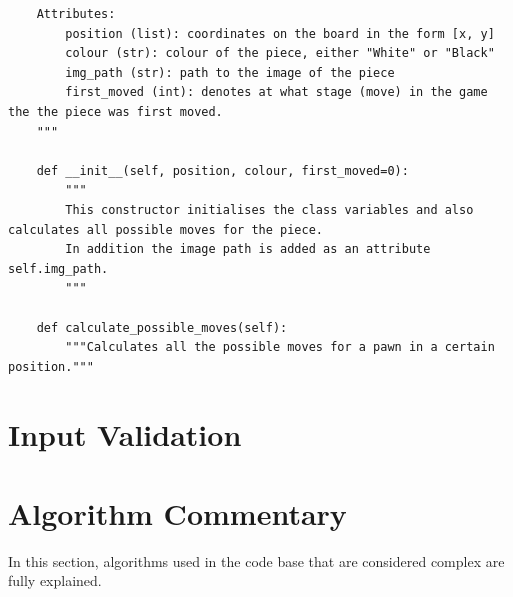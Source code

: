 \begin{verbatim}
	Attributes:
		position (list): coordinates on the board in the form [x, y]
		colour (str): colour of the piece, either "White" or "Black"
		img_path (str): path to the image of the piece
		first_moved (int): denotes at what stage (move) in the game the the piece was first moved.
	"""

	def __init__(self, position, colour, first_moved=0):
		"""
		This constructor initialises the class variables and also calculates all possible moves for the piece.
		In addition the image path is added as an attribute self.img_path.
		"""
	
 	def calculate_possible_moves(self):
		"""Calculates all the possible moves for a pawn in a certain position."""
\end{verbatim}
\section{Input Validation}
\begin{table}[H]
\centering
	\caption{Table of information on input validation.}
\end{table}
\section{Algorithm Commentary}
In this section, algorithms used in the code base that are considered complex are fully explained.
